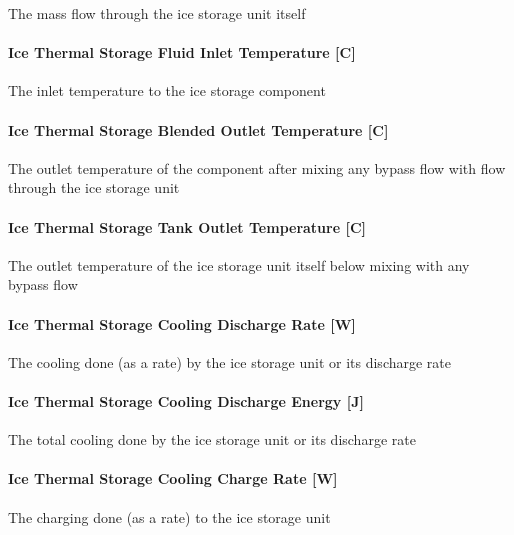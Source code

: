 The mass flow through the ice storage unit itself

\paragraph{Ice Thermal Storage Fluid Inlet Temperature {[}C{]}}\label{ice-thermal-storage-fluid-inlet-temperature-c}

The inlet temperature to the ice storage component

\paragraph{Ice Thermal Storage Blended Outlet Temperature {[}C{]}}\label{ice-thermal-storage-blended-outlet-temperature-c}

The outlet temperature of the component after mixing any bypass flow with flow through the ice storage unit

\paragraph{Ice Thermal Storage Tank Outlet Temperature {[}C{]}}\label{ice-thermal-storage-tank-outlet-temperature-c}

The outlet temperature of the ice storage unit itself below mixing with any bypass flow

\paragraph{Ice Thermal Storage Cooling Discharge Rate {[}W{]}}\label{ice-thermal-storage-cooling-discharge-rate-w-1}

The cooling done (as a rate) by the ice storage unit or its discharge rate

\paragraph{Ice Thermal Storage Cooling Discharge Energy {[}J{]}}\label{ice-thermal-storage-cooling-discharge-energy-j-1}

The total cooling done by the ice storage unit or its discharge rate

\paragraph{Ice Thermal Storage Cooling Charge Rate {[}W{]}}\label{ice-thermal-storage-cooling-charge-rate-w-1}

The charging done (as a rate) to the ice storage unit

